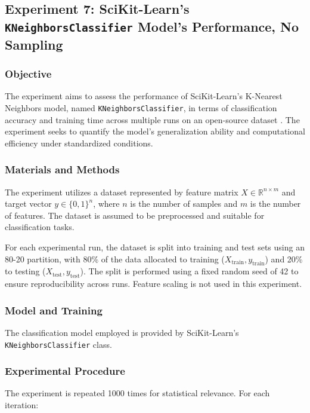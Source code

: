 \documentclass{article}
\theoremstyle{plain}
\theoremstyle{definition}
\theoremstyle{remark}
\begin{document}
\subsection{Experiment 7: SciKit-Learn's \texttt{KNeighborsClassifier} Model's Performance, No Sampling}

\subsubsection{Objective}

The experiment aims to assess the performance of SciKit-Learn's K-Nearest Neighbors model, named \texttt{KNeighborsClassifier}, in terms of classification accuracy and training time across multiple runs on an open-source dataset \cite{iris}. The experiment seeks to quantify the model's generalization ability and computational efficiency under standardized conditions.


\subsubsection{Materials and Methods}

The experiment utilizes a dataset represented by feature matrix $ X \in \mathbb{R}^{n \times m} $ and target vector $ y \in \{0, 1\}^n $, where $ n $ is the number of samples and $ m $ is the number of features. The dataset is assumed to be preprocessed and suitable for classification tasks.

For each experimental run, the dataset is split into training and test sets using an 80-20 partition, with 80\% of the data allocated to training ($ X_{\text{train}}, y_{\text{train}} $) and 20\% to testing ($ X_{\text{test}}, y_{\text{test}} $). The split is performed using a fixed random seed of 42 to ensure reproducibility across runs. Feature scaling is not used in this experiment.


\subsubsection{Model and Training}

The classification model employed is provided by SciKit-Learn's \texttt{KNeighborsClassifier} class.


\subsubsection{Experimental Procedure}

The experiment is repeated 1000 times for statistical relevance. For each iteration:
\end{document}

